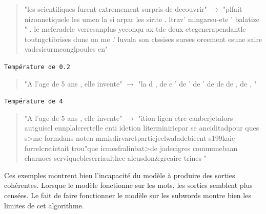   \begin{quotation}
  "les scientifiques furent extremement surpris de decouvrir" $\rightarrow$ "plfait nizonnetiquele les  umen la si arpar les sirite  . ltrav' mingarsu-ete ' balatize  " . le meferadele verresanplus yeconqu ax tde deux  etcgenerapendantle toutngctibrises dune on me  .' luvala son ctssises surses oreement esune saire vadesieurmeonglpoules en"
  \end{quotation}


\noindent{} \texttt{Température de 0.2}

  \begin{quotation}
    
    "A l'age de 5 ans , elle invente" $\rightarrow$ "la d  \hspace{0.3cm},  \hspace{0.3cm}  de   \hspace{0.3cm}  e  \hspace{3cm}                ' de   \hspace{0.6cm}  ' de \hspace{2.7cm}              ' de    \hspace{2cm}     de  \hspace{0.6cm}   de \hspace{0.6cm}   ,  \hspace{0.5cm}         de \hspace{0.3cm}     , \hspace{0.8cm}             "
  \end{quotation}



\noindent{} \texttt{Température de 4}


  \begin{quotation}
  "A l'age de 5 ans , elle invente" $\rightarrow$ "ition ligen etre canberjetalors autguisel ennplalcrertelle enti idetion literminiricpar se anciditadpour ques s>me formdans noten mmisdirvaretparticjeelwaladebieent s199kaie forrelcrstietait trou"que icmesfralinbat>de jadecigres communebaan charnoes serviqueblescrriaulthee aleusdon\&greaire trines "
  \end{quotation}



Ces exemples montrent bien l'incapacité du modèle à produire des sorties
cohérentes. Lorsque le modèle fonctionne sur les mots, les sorties
semblent plus censées. Le fait de faire fonctionner le modèle sur les
subwords montre bien les limites de cet algorithme.

